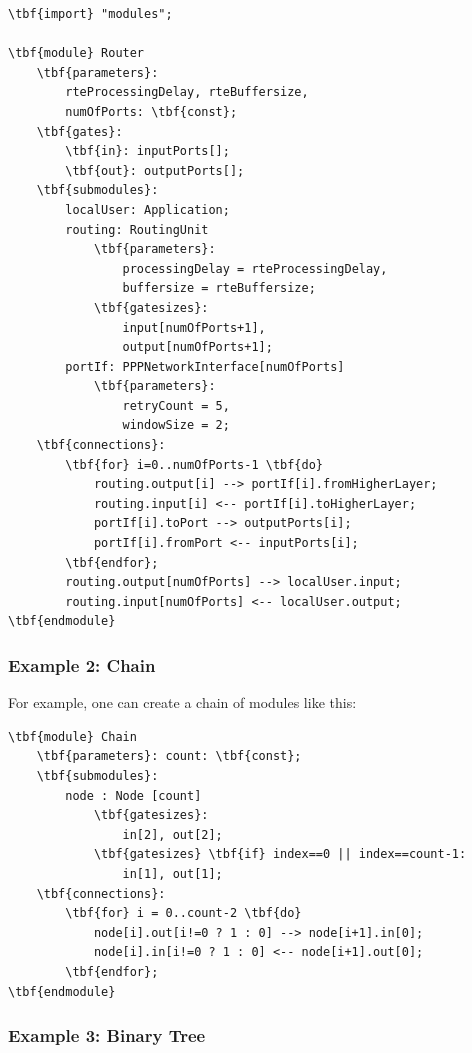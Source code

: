 \begin{Verbatim}[commandchars=\\\{\}]
\tbf{import} "modules";

\tbf{module} Router
    \tbf{parameters}:
        rteProcessingDelay, rteBuffersize,
        numOfPorts: \tbf{const};
    \tbf{gates}:
        \tbf{in}: inputPorts[];
        \tbf{out}: outputPorts[];
    \tbf{submodules}:
        localUser: Application;
        routing: RoutingUnit
            \tbf{parameters}:
                processingDelay = rteProcessingDelay,
                buffersize = rteBuffersize;
            \tbf{gatesizes}:
                input[numOfPorts+1],
                output[numOfPorts+1];
        portIf: PPPNetworkInterface[numOfPorts]
            \tbf{parameters}:
                retryCount = 5,
                windowSize = 2;
    \tbf{connections}:
        \tbf{for} i=0..numOfPorts-1 \tbf{do}
            routing.output[i] --> portIf[i].fromHigherLayer;
            routing.input[i] <-- portIf[i].toHigherLayer;
            portIf[i].toPort --> outputPorts[i];
            portIf[i].fromPort <-- inputPorts[i];
        \tbf{endfor};
        routing.output[numOfPorts] --> localUser.input;
        routing.input[numOfPorts] <-- localUser.output;
\tbf{endmodule}
\end{Verbatim}


\subsubsection{Example 2: Chain}


For example, one can create a chain of modules like this:

\begin{Verbatim}[commandchars=\\\{\}]
\tbf{module} Chain
    \tbf{parameters}: count: \tbf{const};
    \tbf{submodules}:
        node : Node [count]
            \tbf{gatesizes}:
                in[2], out[2];
            \tbf{gatesizes} \tbf{if} index==0 || index==count-1:
                in[1], out[1];
    \tbf{connections}:
        \tbf{for} i = 0..count-2 \tbf{do}
            node[i].out[i!=0 ? 1 : 0] --> node[i+1].in[0];
            node[i].in[i!=0 ? 1 : 0] <-- node[i+1].out[0];
        \tbf{endfor};
\tbf{endmodule}
\end{Verbatim}


\subsubsection{Example 3: Binary Tree}


